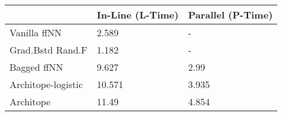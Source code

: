 \begin{tabular}{lll}
\toprule
{} & In-Line (L-Time) & Parallel (P-Time) \\
\midrule
Vanilla ffNN       &            2.589 &                 - \\
Grad.Bstd Rand.F   &            1.182 &                 - \\
Bagged ffNN        &            9.627 &              2.99 \\
Architope-logistic &           10.571 &             3.935 \\
Architope          &            11.49 &             4.854 \\
\bottomrule
\end{tabular}
